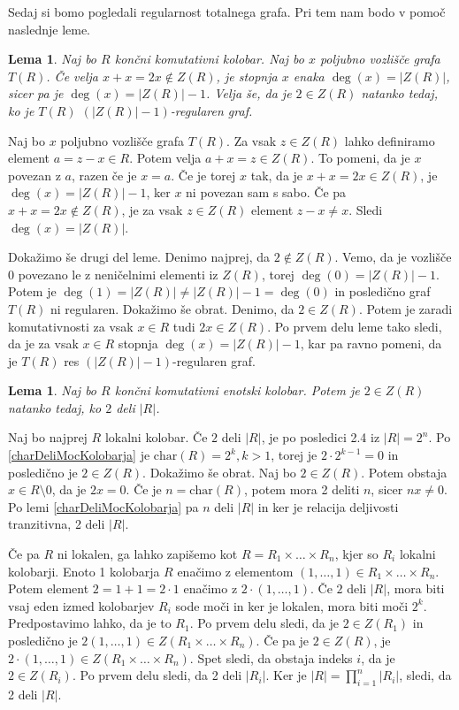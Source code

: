 \documentclass[a4paper, 12pt]{amsart}
\theoremstyle{definition} %
\theoremstyle{plain} %
\newtheorem{lema}[definicija]{Lema}
\begin{document}
Sedaj si bomo pogledali regularnost totalnega grafa. Pri tem nam bodo v pomoč naslednje leme.

\begin{lema}
\label{regular1}
Naj bo $R$ končni komutativni kolobar. Naj bo $x$ poljubno vozlišče grafa $T(R)$. Če velja $x+x = 2x \notin Z(R)$, je stopnja $x$ enaka $\deg(x) = |Z(R)|$, sicer pa je $\deg(x) = |Z(R)| -1$. Velja še, da je  $2\in Z(R)$ natanko tedaj, ko je $T(R)$ $(|Z(R)| - 1)$-regularen graf. 
\end{lema}

\proof
Naj bo $x$ poljubno vozlišče grafa $T(R)$. Za vsak $z\in Z(R)$ lahko definiramo element $a = z -x \in R$. Potem velja $a + x = z\in Z(R)$. To pomeni, da je $x$ povezan z $a$, razen če je $x=a$. Če je torej $x$ tak, da je $x+x = 2x \in Z(R)$, je $\deg(x) = |Z(R)| - 1$, ker $x$ ni povezan sam s sabo. Če pa $x+x=2x \notin Z(R)$, je za vsak $z\in Z(R)$ element $z-x \neq x$. Sledi $\deg(x) = |Z(R)|$.

Dokažimo še drugi del leme. Denimo najprej, da $2\notin Z(R)$. Vemo, da je vozlišče 0 povezano le z neničelnimi elementi iz $Z(R)$, torej $\deg(0)=  |Z(R)| -1 $. Potem je $\deg(1) = |Z(R) | \neq |Z(R)| - 1= \deg(0)$ in posledično graf $T(R)$ ni regularen. 
Dokažimo še obrat. Denimo, da $2  \in Z(R)$. Potem je zaradi komutativnosti za vsak $x\in R$ tudi $2x\in Z(R)$. Po prvem delu leme tako sledi, da je za vsak $x\in R$ stopnja $\deg(x) = |Z(R)| - 1$, kar pa ravno pomeni, da je $T(R)$ res $(|Z(R)| -1)$-regularen graf.
\endproof

\begin{lema}
\label{regular2}
Naj bo $R$ končni komutativni enotski kolobar. Potem je $2\in Z(R)$ natanko tedaj, ko $2$ deli $|R|$.
\end{lema}

\proof
Naj bo najprej $R$ lokalni kolobar. Če $2$ deli $|R|$, je po posledici 2.4 iz \cite{diploma} $|R| = 2^n$. Po \ref{charDeliMocKolobarja} je $\textrm{char}(R) = 2^k, k > 1$, torej je $2 \cdot 2^{k-1} = 0$ in posledično je $2\in Z(R)$. 
Dokažimo še obrat. Naj bo $2\in Z(R)$. Potem obstaja $x\in R\setminus{0}$, da je $2x = 0$. Če je $n = \textrm{char}(R)$, potem mora 2 deliti $n$, sicer $nx\neq 0$. Po lemi \ref{charDeliMocKolobarja} pa $n$ deli $|R|$ in ker je relacija deljivosti tranzitivna, 2 deli $|R|$.

Če pa $R$ ni lokalen, ga lahko zapišemo kot $R = R_1 \times \dots \times R_n$, kjer so $R_i$ lokalni kolobarji. Enoto 1 kolobarja $R$ enačimo z elementom $(1,\dots,1)\in R_1 \times \dots \times R_n$. Potem element $2 = 1+1 = 2 \cdot 1$ enačimo z $2\cdot (1,\dots,1)$. Če $2$ deli $|R|$, mora biti vsaj eden izmed kolobarjev $R_i$ sode moči in ker je lokalen, mora biti moči $2^k$. Predpostavimo lahko, da je to $R_1$. Po prvem delu sledi, da je $2\in Z(R_1)$ in posledično je $2(1,\dots,1) \in Z(R_1\times \dots \times R_n)$. Če pa je $2\in Z(R)$, je $2\cdot (1,\dots,1) \in Z(R_1\times \dots \times R_n)$. Spet sledi, da obstaja indeks $i$, da je $2\in Z(R_i)$. Po prvem delu sledi, da 2 deli $|R_i|$. Ker je $|R| = \prod_{i=1}^n |R_i|$, sledi, da 2 deli $|R|$.
\endproof
\end{document}
